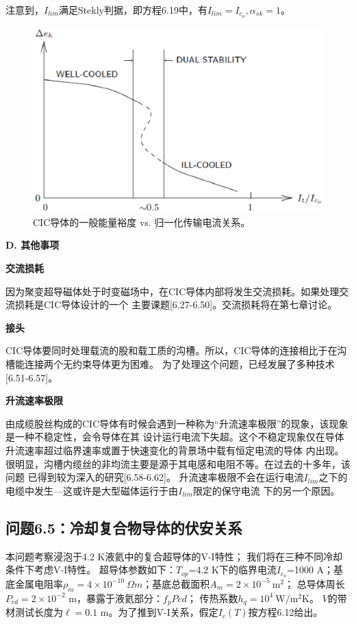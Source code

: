 注意到，$I_{lim}$满足Stekly判据，即方程6.19中，有$I_{lim}=I_{c_o},\alpha_{sk}=1$。
\begin{figure}[htbp]
	\centering
	\includegraphics[scale=0.7]{chpt6/figs/fig6.15.eps}
	\caption{CIC导体的一般能量裕度 vs. 归一化传输电流关系。}
\end{figure}

\textbf{D. 其他事项}

\textbf{交流损耗}

因为聚变超导磁体处于时变磁场中，在CIC导体内部将发生交流损耗。如果处理交流损耗是CIC导体设计的一个
主要课题[6.27-6.50]。交流损耗将在第七章讨论。

\textbf{接头}

CIC导体要同时处理载流的股和载工质的沟槽。所以，CIC导体的连接相比于在沟槽能连接两个无约束导体更为困难。
为了处理这个问题，已经发展了多种技术[6.51-6.57]。

\textbf{升流速率极限}

由成缆股丝构成的CIC导体有时候会遇到一种称为“升流速率极限”的现象，该现象是一种不稳定性，会令导体在其
设计运行电流下失超。这个不稳定现象仅在导体升流速率超过临界速率或置于快速变化的背景场中载有恒定电流的导体
内出现。很明显，沟槽内缆丝的非均流主要是源于其电感和电阻不等。在过去的十多年，该问题
已得到较为深入的研究[6.58-6.62]。
升流速率极限不会在运行电流$I_{lim}$之下的电缆中发生---这或许是大型磁体运行于由$I_{lim}$限定的保守电流
下的另一个原因。

\subsection{问题6.5：冷却复合物导体的伏安关系}
本问题考察浸泡于4.2 K液氦中的复合超导体的V-I特性；
我们将在三种不同冷却条件下考虑V-I特性。
超导体参数如下：$T_{op}$=4.2 K下的临界电流$I_{c_o}$=1000 A；基底金属电阻率$\rho_m=4\times 10^{-10}\ 
\Omega m$；基底总截面积$A_m=2\times 10^{-5}\ \mathrm{m^2}$；
总导体周长$P_{cd}=2\times 10^{-2}$ m，暴露于液氦部分：$f_p P{cd}$；
传热系数$h_q=10^4\ \mathrm{W/m^2K}$。
$V$的带材测试长度为$\ell=0.1$ m。为了推到V-I关系，假定$I_c(T)$按方程6.12给出。

